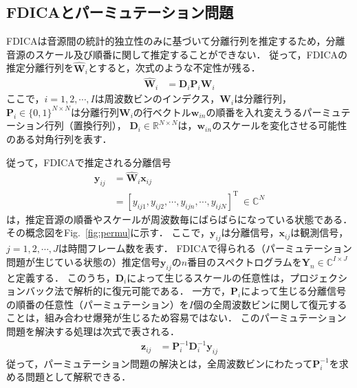 \documentclass[a4j]{jsarticle}
\begin{document}
\subsection{FDICAとパーミュテーション問題}
FDICAは音源間の統計的独立性のみに基づいて分離行列を推定するため，分離音源のスケール及び順番に関して推定することができない．
従って，FDICAの推定分離行列を$\hat{\bm{W}}_i$とすると，次式のような不定性が残る．
\begin{align}
	\hat{\bm{W}}_{i} &= \bm{D}_{i}\bm{P}_{i}  \bm{W}_{i} \label{eq:w_fdica}
\end{align}
ここで，$i=1,2,\cdots,I$は周波数ビンのインデクス，$\bm{W}_{i}$は分離行列，$\bm{P}_i \in \{0, 1\}^{N \times N}$は分離行列$\bm{W}_{i}$の行ベクトル$\bm{w}_{in}$の順番を入れ変えうるパーミュテーション行列（置換行列），
$\bm{D}_i \in \mathbb{R}^{N \times N}$は，$\bm{w}_{in}$のスケールを変化させる可能性のある対角行列を表す．

従って，FDICAで推定される分離信号
\begin{align}
\bm{y}_{ij} &= \hat{\bm{W}}_i\bm{x}_{ij} \\
&=\left[ y_{ij1},y_{ij2}, \cdots, y_{ijn}, \cdots, y_{ijN} \right]^\mathrm{T}~\in \mathbb{C}^{N} \label{eq:sepSig}
\end{align}
は，推定音源の順番やスケールが周波数毎にばらばらになっている状態である．その概念図をFig.~\ref{fig:permu}に示す．
ここで，$\bm{y}_{ij}$は分離信号，$\bm{x}_{ij}$は観測信号，$j=1,2,\cdots,J$は時間フレーム数を表す．
FDICAで得られる（パーミュテーション問題が生じている状態の）推定信号$\bm{y}_{ij}$の$n$番目のスペクトログラムを$\bm{Y}_n \in \mathbb{C}^{I \times J}$と定義する．
このうち，$\bm{D}_i$によって生じるスケールの任意性は，プロジェクションバック法\cite{Matsuoka2001_PB}で解析的に復元可能である．
一方で，$\bm{P}_i$によって生じる分離信号の順番の任意性（パーミュテーション）を$I$個の全周波数ビンに関して復元することは，組み合わせ爆発が生じるため容易ではない．
このパーミュテーション問題を解決する処理は次式で表される．
\begin{align}
\bm{z}_{ij} &= \bm{P}_{i}^{-1}\bm{D}_{i}^{-1}\bm{y}_{ij} \label{eq:z}
\end{align}
従って，パーミュテーション問題の解決とは，全周波数ビンにわたって$\bm{P}_{i}^{-1}$を求める問題として解釈できる．
\end{document}
